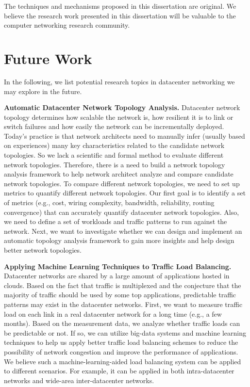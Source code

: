The techniques and mechanisms proposed in this dissertation are original. 
We believe the research work presented in this dissertation will be valuable to 
the computer networking research community.

\section{Future Work}
In the following, we list potential research topics in datacenter networking we may explore in the future.

{\bf Automatic Datacenter Network Topology Analysis.}
Datacenter network topology determines how scalable the network is,
how resilient it is to link or switch failures and how easily the network
can be incrementally deployed. Today's practice is that network architects need to
manually infer (usually based on experiences) many key characteristics related to
the candidate network topologies. So we lack a scientific and formal method to
evaluate different network topologies. Therefore, there is a need to build a network
topology analysis framework to help network architect analyze and compare
candidate network topologies. To compare different network topologies, we need to
set up metrics to quantify different network topologies. Our first goal is to
identify a set of metrics (e.g., cost, wiring complexity, bandwidth, reliability, routing convergence) that
can accurately quantify datacenter network topologies.  Also, we need to define a set of workloads
and traffic patterns to run against the network. 
Next, we want to investigate whether we can design and implement
an automatic topology analysis framework to gain more insights and help design better network topologies.

{\bf Applying Machine Learning Techniques to Traffic Load Balancing.}
Datacenter networks are shared by a large amount of applications hosted in clouds. 
Based on the fact that traffic is multiplexed and the conjecture that the majority of traffic 
should be used by some top applications, predictable traffic patterns may 
exist in the datacenter networks. First, we want to measure traffic load on each link 
in a real datacenter network for a long time (e.g., a few months). Based on the measurement data, 
we analyze whether traffic loads can be predictable or not. If so, we can utilize 
big-data systems and machine learning techniques to help us apply better traffic load 
balancing schemes to reduce the possibility of network congestion and improve the 
performance of applications. We believe such a machine-learning-aided load balancing 
system can be applied to different scenarios. For example, it can be applied in 
both intra-datacenter networks and wide-area inter-datacenter networks.

